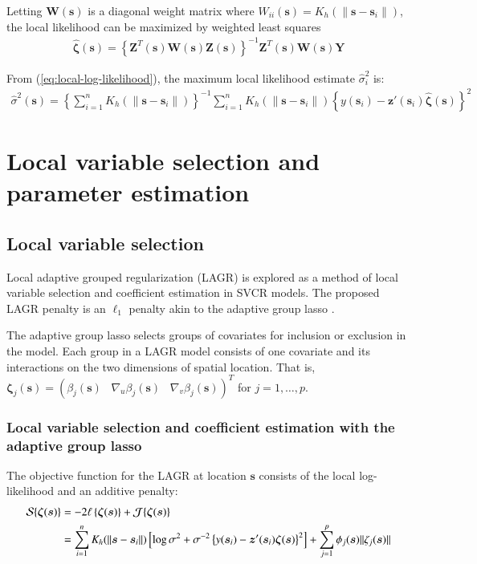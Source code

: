 \documentclass[authoryear, review, 11pt]{elsarticle}
\begin{document}
    Letting $\bm{W}(\bm{s})$ is a diagonal weight matrix where $W_{ii}(\bm{s}) = K_h( \| \bm{s} - \bm{s}_i \| )$, the local likelihood can be maximized by weighted least squares
    \begin{align}\label{eq:beta-hat}
        \hat{\bm{\zeta}}(\bm{s}) = \left\{ \bm{Z}^T(\bm{s}) \bm{W}(\bm{s}) \bm{Z}(\bm{s}) \right\}^{-1} \bm{Z}^T(\bm{s}) \bm{W}(\bm{s}) \bm{Y}
    \end{align}

    
  From (\ref{eq:local-log-likelihood}), the maximum local likelihood estimate $\hat{\sigma}_i^2$ is:	 
  \begin{align}
    \hat{\sigma}^2(\bm{s}) = \left\{ \sum \limits_{i=1}^{n} K_h( \| \bm{s} - \bm{s}_i \| ) \right\}^{-1} \sum \limits_{i=1}^n K_h( \| \bm{s} - \bm{s}_i \| ) \left\{ y(\bm{s}_i) - \bm{z}'(\bm{s}_i) \hat{\bm{\zeta}}(\bm{s}) \right\}^2
  \end{align}
	 

\section{Local variable selection and parameter estimation \label{section:model-selection}}
	\subsection{Local variable selection}
	Local adaptive grouped regularization (LAGR) is explored as a method of local variable selection and coefficient estimation in SVCR models. The proposed LAGR penalty is an $\ell_1$ penalty akin to the adaptive group lasso \citep{Wang-Leng-2008,Zou:2006}.

    The adaptive group lasso selects groups of covariates for inclusion or exclusion in the model. Each group in a LAGR model consists of one covariate and its interactions on the two dimensions of spatial location. That is, $\bm{\zeta}_j(\bm{s}) = \left( \beta_j(\bm{s}) \;\;\; \nabla_u \beta_j(\bm{s}) \;\;\; \nabla_v \beta_j(\bm{s}) \right)^T$ for $j=1, \dots, p$.
	
	\subsubsection{Local variable selection and coefficient estimation with the adaptive group lasso}
	The objective function for the LAGR at location $\bm{s}$ consists of the local log-likelihood and an additive penalty:%
	\begin{align}\label{eq:adaptive-lasso-WLS}
		\mathcal{S} \{ \bm{\zeta}(\bm{s}) \} &= -2 \ell \left\{ \bm{\zeta}( \bm{s} ) \right\} + \mathcal{J}\{ \bm{\zeta}(\bm{s}) \} \notag \\
		&= \sum_{i=1}^n K_h( \| \bm{s} - \bm{s}_i \| )  \left[ \log{\sigma^2}  + \sigma^{-2}  \left\{ y(\bm{s}_i) - \bm{z}'(\bm{s}_i) \bm{\zeta}(\bm{s}) \right\}^2 \right] +  \sum_{j=1}^p \phi_j(\bm{s}) \| \zeta_j(\bm{s}) \| 
	\end{align}
	
\end{document}
